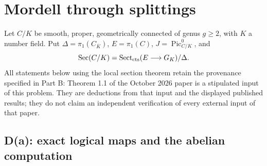 \section{Mordell through splittings}
\label{sec:D}
Let $C/K$ be smooth, proper, geometrically connected of
genus $g\geq2$, with $K$ a number field. Put
$\Delta=\pi_1(C_{\overline K})$, $E=\pi_1(C)$,
$J=\operatorname{Pic}^0_{C/K}$, and
\[
 \operatorname{Sec}(C/K)=
 \operatorname{Sect}_{\rm cts}(E\longrightarrow G_K)/\Delta .
\]
All statements below using the local section theorem retain
the provenance specified in Part B: Theorem 1.1 of the
October 2026 paper is a stipulated input of this problem.
They are deductions from that input and the displayed
published results; they do not claim an independent
verification of every external input of that paper.

\subsection{D(a): exact logical maps and the abelian computation}

